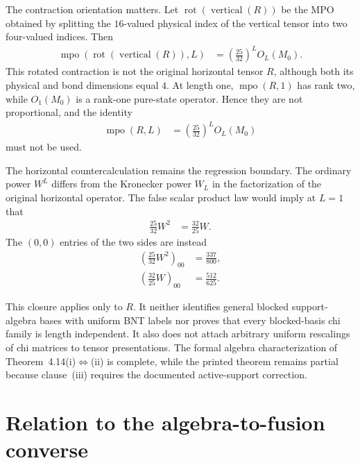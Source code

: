 \documentclass{article}
\begin{document}
The contraction orientation matters. Let
$\operatorname{rot}(\operatorname{vertical}(R))$ be the MPO obtained by
splitting the $16$-valued physical index of the vertical tensor into two
four-valued indices. Then
\begin{align}
    \operatorname{mpo}\!\left(\operatorname{rot}(\operatorname{vertical}(R)),L\right)
        &= \left(\frac{25}{32}\right)^L O_L(M_0).
\label{eq:cpgsv17_blocked_chi_uniformity_rotated_vertical_contraction}
\end{align}
This rotated contraction is not the original horizontal tensor $R$, although
both its physical and bond dimensions equal $4$. At length one,
$\operatorname{mpo}(R,1)$ has rank two, while $O_1(M_0)$ is a rank-one
pure-state operator. Hence they are not proportional, and the identity
\begin{align}
    \operatorname{mpo}(R,L)
        &= \left(\frac{25}{32}\right)^L O_L(M_0)
\label{eq:cpgsv17_blocked_chi_uniformity_false_horizontal_vertical_identity}
\end{align}
must not be used.

The horizontal countercalculation remains the regression boundary. The
ordinary power $W^L$ differs from the Kronecker power $W_L$ in the
factorization of the original horizontal operator. The false scalar product
law would imply at $L=1$ that
\begin{align}
    \frac{25}{32}W^2
        &= \frac{32}{25}W.
\label{eq:cpgsv17_blocked_chi_uniformity_false_W_scalar_law}
\end{align}
The $(0,0)$ entries of the two sides are instead
\begin{align}
    \left(\frac{25}{32}W^2\right)_{00}
        &= \frac{337}{800},
\label{eq:cpgsv17_blocked_chi_uniformity_left_W_entry}\\
    \left(\frac{32}{25}W\right)_{00}
        &= \frac{512}{625}.
\label{eq:cpgsv17_blocked_chi_uniformity_right_W_entry}
\end{align}

This closure applies only to $R$. It neither identifies general blocked
support-algebra bases with uniform BNT labels nor proves that every
blocked-basis chi family is length independent. It also does not attach
arbitrary uniform rescalings of chi matrices to tensor presentations. The
formal algebra characterization of
Theorem~4.14(i)$\Leftrightarrow$(ii) is complete, while the printed theorem
remains partial because clause~(iii) requires the documented active-support
correction.

\section{Relation to the algebra-to-fusion converse}
\end{document}
